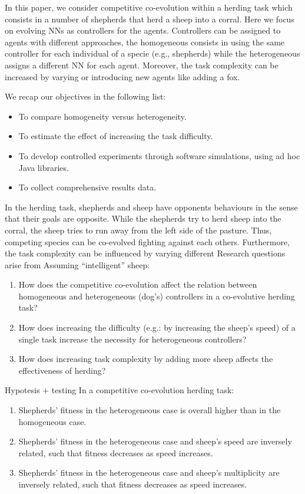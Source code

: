 \documentclass[conference]{IEEEtran}
\begin{document}
In this paper, we consider competitive co-evolution within a herding task which consists in a number of shepherds that herd a sheep into a corral.
Here we focus on evolving NNs as controllers for the agents.
Controllers can be assigned to agents with different approaches, the homogeneous consists in using the same controller for each individual of a specie (e.g., shepherds) while the heterogeneous assigns a different NN for each agent.
Moreover, the task complexity can be increased by varying or introducing new agents like adding a fox.

We recap our objectives in the following list:

\begin{itemize}
	\item To compare homogeneity versus heterogeneity.
	\item To estimate the effect of increasing the task difficulty.
 	\item To develop controlled experiments through software simulations, using ad hoc Java libraries.
	\item To collect comprehensive results data.
\end{itemize}
 
In the herding task, shepherds and sheep have opponents behaviours in the sense that their goals are opposite.
While the shepherds try to herd sheep into the corral, the sheep tries to run away from the left side of the pasture.
Thus, competing species can be co-evolved fighting against each others.
Furthermore, the task complexity can be influenced by varying different  
Research questions arise from 
Assuming “intelligent” sheep:
 
\begin{enumerate}
	\item How does the competitive co-evolution affect the relation between homogeneous and heterogeneous (dog’s) controllers in a co-evolutive herding task?
	\item How does increasing the difficulty (e.g.: by increasing the sheep’s speed) of a single task increase the necessity for heterogeneous controllers?
	\item How does increasing task complexity by adding more sheep affects the effectiveness of herding?
\end{enumerate}

Hypotesis + testing
In a competitive co-evolution herding task:	

\begin{enumerate}
	\item Shepherds’ fitness in the heterogeneous case is overall higher than in the homogeneous case.
	\item Shepherds’ fitness in the heterogeneous case and sheep’s speed are inversely related, such that fitness decreases as speed increases.
	\item Shepherds’ fitness in the heterogeneous case and sheep’s multiplicity are inversely related, such that fitness decreases as speed increases.
\end{enumerate}
\end{document}
